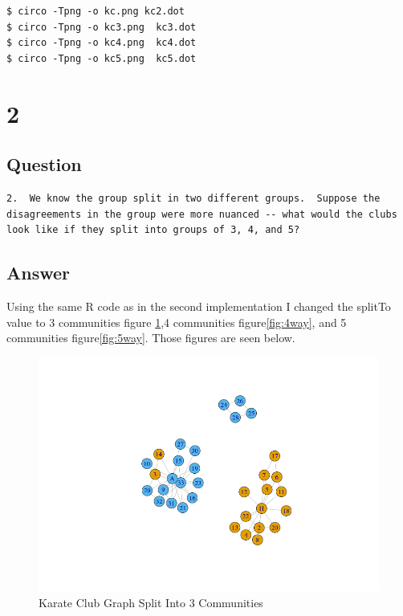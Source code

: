 \documentclass[letterpaper,10pt]{article}
\begin{document}
\newpage

\newpage
\begin{lstlisting}[frame=single,caption={Convert dot files to png}]
$ circo -Tpng -o kc.png kc2.dot
$ circo -Tpng -o kc3.png  kc3.dot
$ circo -Tpng -o kc4.png  kc4.dot
$ circo -Tpng -o kc5.png  kc5.dot
\end{lstlisting}
\newpage

\newpage

\section*{2}
\subsection*{Question}

\begin{verbatim}
2.  We know the group split in two different groups.  Suppose the
disagreements in the group were more nuanced -- what would the clubs
look like if they split into groups of 3, 4, and 5?

\end{verbatim}

\subsection*{Answer}
Using the same R code as in the second implementation I changed the splitTo value to 3 communities figure \ref{fig:3way},4 communities figure\ref{fig:4way}, and 5 communities figure\ref{fig:5way}. Those figures are seen below.

\begin{figure}[h]
\includegraphics[scale=0.5]{clubSplit3.png}
\caption{Karate Club Graph Split Into 3 Communities}
\label{fig:3way}
\end{figure}
\end{document}
